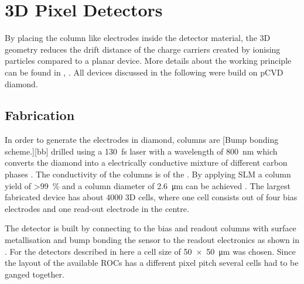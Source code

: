 \section{3D Pixel Detectors}
By placing the column like electrodes inside the detector material, the 3D geometry reduces the drift distance of the charge carriers created by ionising particles compared to a planar device. More details about the working principle can be found in \cite{parker}, \cite{3D}. All devices discussed in the following were build on \ac{pCVD} diamond.
\subsection{Fabrication}
In order to generate the electrodes in diamond, columns are 
[Bump bonding scheme.][bb]
drilled using a \SI{130}{\femto\second} laser with a wavelength of \SI{800}{\nano\meter} which converts the diamond into a electrically conductive mixture of different carbon phases \cite{3dfab}. The conductivity of the columns is of the . By applying \ac{SLM} a column yield of \SI{>99}{\%} and a column diameter of \SI{2.6}{\micro\meter} can be achieved \cite{slm}. The largest fabricated device has about 4000 3D cells, where one cell consists out of four bias electrodes and one read-out electrode in the centre. \par
The detector is built by connecting to the bias and readout columns with surface metallisation and bump bonding the sensor to the readout electronics as shown in . For the detectors described in here a cell size of \SI{50x50}{\micro\meter} was chosen. Since the layout of the available \acp{ROC} has a different pixel pitch several cells had to be ganged together.
